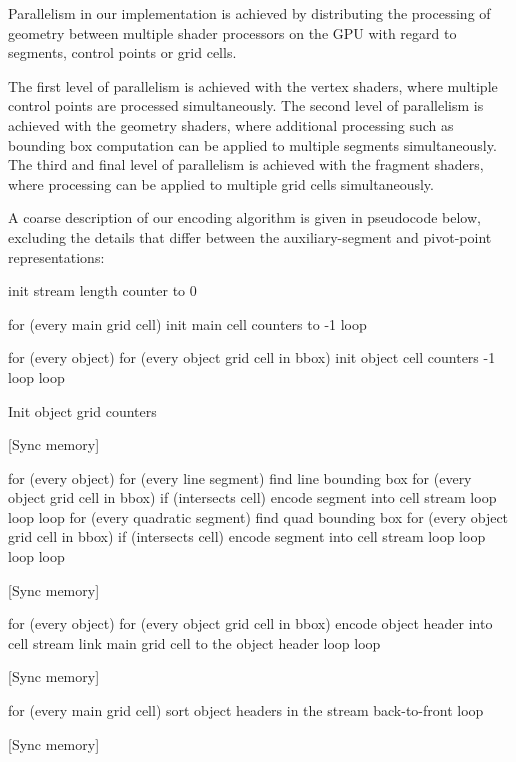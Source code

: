 \documentclass[11pt,a4paper,twoside]{article}
\begin{document}
Parallelism in our implementation is achieved by distributing the processing of geometry between multiple shader processors on the GPU with regard to segments, control points or grid cells. 

The first level of parallelism is achieved with the vertex shaders, where multiple control points are processed simultaneously. The second level of parallelism is achieved with the geometry shaders, where additional processing such as bounding box computation can be applied to multiple segments simultaneously. The third and final level of parallelism is achieved with the fragment shaders, where processing can be applied to multiple grid cells simultaneously.

A coarse description of our encoding algorithm is given in pseudocode below, excluding the details that differ between the auxiliary-segment and pivot-point representations:
\def\verbatimtabsize{3\relax} 
\begin {verbatimtab}

init stream length counter to 0

for (every main grid cell)
	init main cell counters to -1
loop

for (every object)
	for (every object grid cell in bbox)
		init object cell counters -1
	loop
loop

Init object grid counters

[Sync memory]

for (every object)
	for (every line segment)
		find line bounding box
		for (every object grid cell in bbox)
			if (intersects cell)
				encode segment into cell stream
			loop
		loop
	loop
	for (every quadratic segment)
		find quad bounding box
		for (every object grid cell in bbox)
			if (intersects cell)
				encode segment into cell stream
			loop
		loop
	loop
loop

[Sync memory]

for (every object)
	for (every object grid cell in bbox)
		encode object header into cell stream
		link main grid cell to the object header
	loop
loop

[Sync memory]

for (every main grid cell)
	sort object headers in the stream back-to-front 
loop

[Sync memory]
\end {verbatimtab}
\end{document}
